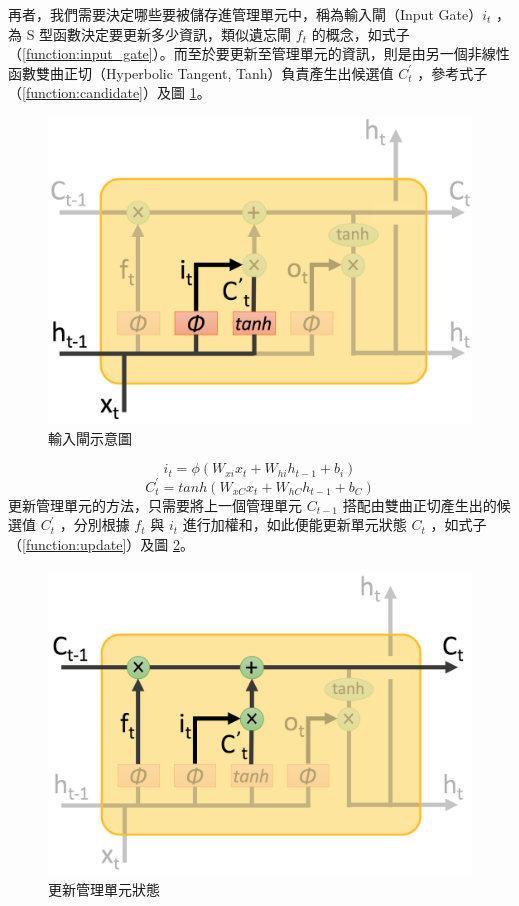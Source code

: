 再者，我們需要決定哪些要被儲存進管理單元中，稱為輸入閘（Input Gate）$i_t$ ，為 S 型函數決定要更新多少資訊，類似遺忘閘 $f_t$ 的概念，如式子（\ref{function:input_gate}）。而至於要更新至管理單元的資訊，則是由另一個非線性函數雙曲正切（Hyperbolic Tangent, Tanh）負責產生出候選值 $C_t^{'}$ ，參考式子（\ref{function:candidate}）及圖 \ref{fig:input_gate}。
\begin{figure}[h]
    \centering
    \includegraphics[scale=0.35]{images/chap2_input.png}
    \caption{輸入閘示意圖}\label{fig:input_gate}
\end{figure}
\begin{equation}
    i_t = \phi(W_{xi}x_t + W_{hi}h_{t-1} + b_i) \label{function:input_gate}
\end{equation}
\begin{equation}
    C_t^{'} = tanh(W_{xC}x_t + W_{hC}h_{t-1} + b_C) \label{function:candidate}
\end{equation}
更新管理單元的方法，只需要將上一個管理單元 $C_{t-1}$ 搭配由雙曲正切產生出的候選值 $C_t^{'}$ ，分別根據 $f_t$ 與 $i_t$ 進行加權和，如此便能更新單元狀態 $C_t$ ，如式子（\ref{function:update}）及圖 \ref{fig:update}。
\begin{figure}[h]
    \centering
    \includegraphics[scale=0.35]{images/chap2_update.png}
    \caption{更新管理單元狀態}\label{fig:update}
\end{figure}

